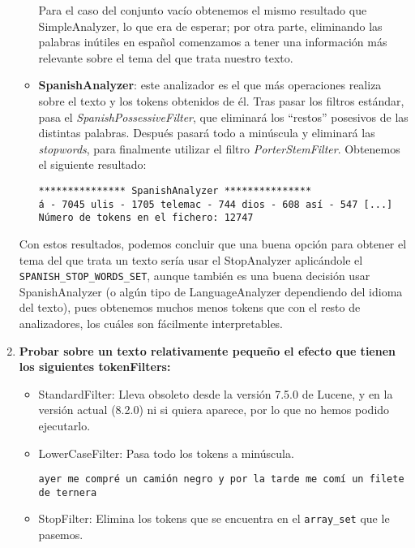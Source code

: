 \begin{enumerate}
\begin{itemize}
	Para el caso del conjunto vacío obtenemos el mismo resultado que SimpleAnalyzer, lo que era de esperar; por otra parte, eliminando las palabras inútiles en español comenzamos a tener una información más relevante sobre el tema del que trata nuestro texto.\\
	
	\item \textbf{SpanishAnalyzer}: este analizador es el que más operaciones realiza sobre el texto y los tokens obtenidos de él. Tras pasar los filtros estándar, pasa el \textit{SpanishPossessiveFilter}, que eliminará los ``restos'' posesivos de las distintas palabras. Después pasará todo a minúscula y eliminará las \textit{stopwords}, para finalmente utilizar el filtro \textit{PorterStemFilter}. Obtenemos el siguiente resultado:
	
	\texttt{*************** SpanishAnalyzer ***************\\á - 7045		ulis - 1705		telemac - 744		dios - 608		así - 547		[...]\\Número de tokens en el fichero: 12747}\\
\end{itemize}

Con estos resultados, podemos concluir que una buena opción para obtener el tema del que trata un texto sería usar el StopAnalyzer aplicándole el \texttt{SPANISH\_STOP\_WORDS\_SET}, aunque también es una buena decisión usar SpanishAnalyzer (o algún tipo de LanguageAnalyzer dependiendo del idioma del texto), pues obtenemos muchos menos tokens que con el resto de analizadores, los cuáles son fácilmente interpretables.\\



\item \textbf{Probar sobre un texto relativamente pequeño el efecto que tienen los siguientes tokenFilters:}
\begin{itemize}
	\item StandardFilter: Lleva obsoleto desde la versión 7.5.0 de Lucene, y en la versión actual (8.2.0) ni si quiera aparece, por lo que no hemos podido ejecutarlo.
	
	\item LowerCaseFilter: Pasa todo los tokens a minúscula.
	
	\texttt{ayer me compré un camión negro y por la tarde me comí un filete de ternera}
	
	\item StopFilter: Elimina los tokens que se encuentra en el \texttt{array\_set} que le pasemos.
	

\end{itemize}
\end{enumerate}

